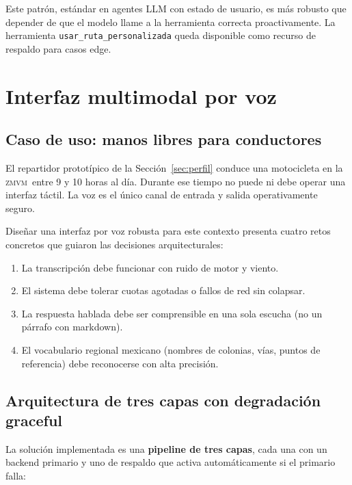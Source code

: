 \documentclass[11pt,a4paper]{article}
\newcommand{\ZMVM}{\textsc{zmvm}}
\begin{document}
Este patrón, estándar en agentes LLM con estado de usuario, es
más robusto que depender de que el modelo llame a la herramienta
correcta proactivamente. La herramienta
\texttt{usar\_ruta\_personalizada} queda disponible como recurso
de respaldo para casos edge.

\section{Interfaz multimodal por voz}
\label{sec:voz}

\subsection{Caso de uso: manos libres para conductores}

El repartidor prototípico de la Sección~\ref{sec:perfil} conduce
una motocicleta en la \ZMVM\ entre \num{9} y \num{10} horas al
día. Durante ese tiempo no puede ni debe operar una interfaz
táctil. La voz es el único canal de entrada y salida
operativamente seguro.

Diseñar una interfaz por voz robusta para este contexto presenta
cuatro retos concretos que guiaron las decisiones arquitecturales:

\begin{enumerate}
\item La transcripción debe funcionar con ruido de motor y viento.
\item El sistema debe tolerar cuotas agotadas o fallos de red
sin colapsar.
\item La respuesta hablada debe ser comprensible en una sola
escucha (no un párrafo con markdown).
\item El vocabulario regional mexicano (nombres de colonias,
vías, puntos de referencia) debe reconocerse con alta precisión.
\end{enumerate}

\subsection{Arquitectura de tres capas con degradación graceful}

La solución implementada es una \textbf{pipeline de tres capas},
cada una con un backend primario y uno de respaldo que activa
automáticamente si el primario falla:
\end{document}
